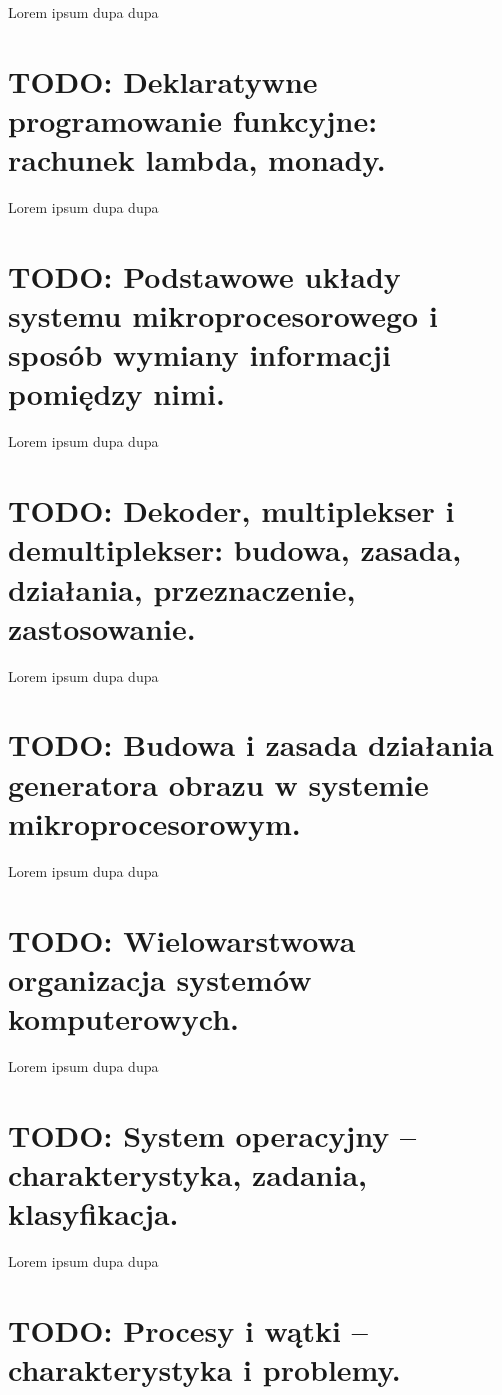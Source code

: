 \documentclass[a4paper,12pt,oneside]{book}
\begin{document}
					Lorem ipsum dupa dupa
					
	\setcounter{section}{51}
	\section{\color{red} TODO: Deklaratywne programowanie funkcyjne: rachunek lambda, monady. }
					
					Lorem ipsum dupa dupa
	
	\setcounter{section}{53}
	\section{\color{red} TODO: Podstawowe układy systemu mikroprocesorowego i sposób wymiany informacji pomiędzy nimi. }
					
					Lorem ipsum dupa dupa
	
	\setcounter{section}{54}
	\section{\color{red} TODO: Dekoder, multiplekser i demultiplekser: budowa, zasada, działania, przeznaczenie, zastosowanie. }
					
					Lorem ipsum dupa dupa
	
	\setcounter{section}{56}
	\section{\color{red} TODO: Budowa i zasada działania generatora obrazu w systemie mikroprocesorowym. }
					
					Lorem ipsum dupa dupa
	
	\setcounter{section}{22}
	\section{\color{red} TODO: Wielowarstwowa organizacja systemów komputerowych. }
						
						Lorem ipsum dupa dupa
	
	\setcounter{section}{23}
	\section{\color{red} TODO: System operacyjny – charakterystyka, zadania, klasyfikacja. }
						
						Lorem ipsum dupa dupa
	
	\setcounter{section}{24}
	\section{\color{red} TODO: Procesy i wątki – charakterystyka i problemy. }
						
\end{document}
